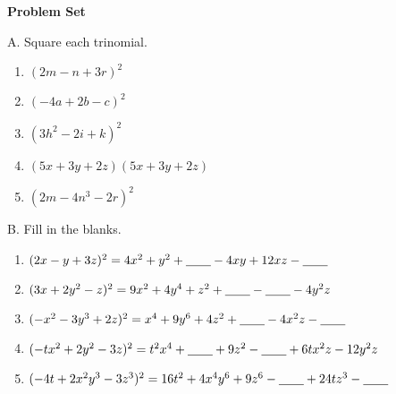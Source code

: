 \textbf{Problem Set}

\vspce

A. Square each trinomial.   
\begin{enumerate}
\item \hspce $(2m - n + 3r)^{2}$
\item \hspce $(-4a + 2b - c)^{2}$
\item \hspce $(3h^{2} - 2i + k)^{2}$
\item \hspce $(5x + 3y + 2z)(5x + 3y + 2z)$
\item \hspce $(2m - 4n^{3} - 2r)^{2}$
\end{enumerate}

B. Fill in the blanks. 
\begin{enumerate}[label = \arabic*. ]
\item \hspce $(2x - y + 3z)^{2} = 4 x^{2} + y^{2} + \underline{\hspace{2em}}  - 4 x y + 12 x z  - \underline{\hspace{2em}}  $

\item \hspce $(3x + 2y^{2} - z)^{2} = 9 x^{2} + 4 y^{4} + z^{2} + \underline{\hspace{2em}}  - \underline{\hspace{2em}}   - 4 y^{2} z$
\item \hspce $(-x^{2} - 3y^{3} + 2z)^{2} = x^{4} + 9 y^{6} + 4 z^{2} + \underline{\hspace{2em}}  - 4 x^{2} z - \underline{\hspace{2em}} $

\item \hspce $(-tx^{2} + 2y^{2} - 3z)^{2} = t^{2} x^{4} + \underline{\hspace{2em}}  + 9 z^{2} - \underline{\hspace{2em}}  + 6 t x^{2} z  - 12 y^{2} z $

\item \hspce $(-4t + 2x^{2}y^{3} - 3z^{3})^{2} = 16 t^{2} + 4 x^{4} y^{6} + 9 z^{6} - \underline{\hspace{2em}}  + 24 t z^{3}  - \underline{\hspace{2em}}  $

\end{enumerate}  